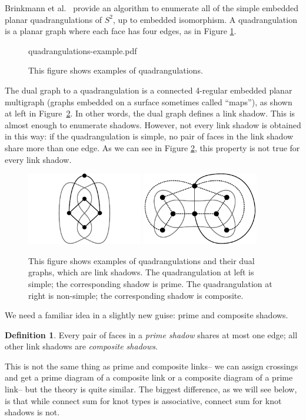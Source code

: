 \documentclass[amsmath,secnumarabic,floatfix,amssymb,nofootinbib,nobibnotes,letterpaper,11pt,tightenlines,showkeys]{revtex4}
\theoremstyle{definition}
\newtheorem{definition}[theorem]{Definition}
\let\mgp=\marginpar \marginparwidth18mm \marginparsep1mm
\def\marginpar#1{\mgp{\raggedright\tiny #1}}
\let\lbl=\label
\def\label#1{\lbl{#1}\ifinner\else\marginpar{\ref{#1} #1}\ignorespaces\fi}
\begin{document}
Brinkmann et al.~\cite{Brinkmann:2007up} provide an algorithm to enumerate all of the simple embedded planar quadrangulations of $S^2$, up to embedded isomorphism. A quadrangulation is a planar graph where each face has four edges, as in Figure \ref{fig:QuadExamples}.
\begin{figure}
	\begin{overpic}[width=4in]{quadrangulations-example.pdf}
	\end{overpic}
	\caption{\label{fig:QuadExamples} This figure shows examples of quadrangulations.}
\end{figure}
The dual graph to a quadrangulation is a connected 4-regular embedded planar multigraph (graphs embedded on a surface sometimes called ``maps''), as shown at left in Figure~\ref{fig:NonSimpleQuad}. In other words, the dual graph defines a link shadow. This is almost enough to enumerate shadows. However, not every link shadow is obtained in this way: if the quadrangulation is simple, no pair of faces in the link shadow share more than one edge. As we can see in Figure \ref{fig:NonSimpleQuad}, this property is not true for every link shadow.
\begin{figure}
\hphantom{.}
\hfill
\includegraphics[height=1.25in]{quadrangulation} \hfill
\includegraphics[height=1.25in]{non-simple-quadrangulation}
\hfill
\hphantom{.}
\caption{\label{fig:NonSimpleQuad} This figure shows examples of quadrangulations and their dual graphs, which are link shadows. The quadrangulation at left is simple; the corresponding shadow is prime. The quadrangulation at right is non-simple; the corresponding shadow is composite.}
\end{figure}
We need a familiar idea in a slightly new guise: prime and composite shadows.
\begin{definition}
Every pair of faces in a \emph{prime shadow} shares at most one edge; all other link shadows are \emph{composite shadows}.
\end{definition}
This is not the same thing as prime and composite links-- we can assign crossings and get a prime diagram of a composite link or a composite diagram of a prime link-- but the theory is quite similar. The biggest difference, as we will see below, is that while connect sum for knot types is associative, connect sum for knot shadows is not.
\end{document}
